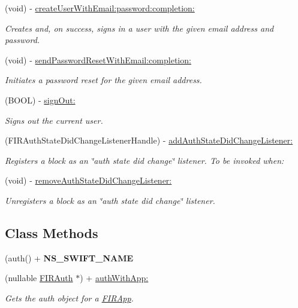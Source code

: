 \begin{DoxyCompactItemize}
(void) -\/ \hyperlink{interface_f_i_r_auth_aeaee7fcef878990954f8e72f7278cd7d}{create\+User\+With\+Email\+:password\+:completion\+:}
\begin{DoxyCompactList}\small\item\em Creates and, on success, signs in a user with the given email address and password. \end{DoxyCompactList}\item 
(void) -\/ \hyperlink{interface_f_i_r_auth_a05d5232f0666b7c197a9296fee7c3b68}{send\+Password\+Reset\+With\+Email\+:completion\+:}
\begin{DoxyCompactList}\small\item\em Initiates a password reset for the given email address. \end{DoxyCompactList}\item 
(B\+O\+O\+L) -\/ \hyperlink{interface_f_i_r_auth_ab0d5111f05c3f1906243852cc8ef41b1}{sign\+Out\+:}
\begin{DoxyCompactList}\small\item\em Signs out the current user. \end{DoxyCompactList}\item 
(F\+I\+R\+Auth\+State\+Did\+Change\+Listener\+Handle) -\/ \hyperlink{interface_f_i_r_auth_ad02b7299781bfc4b3509adc4f90359c3}{add\+Auth\+State\+Did\+Change\+Listener\+:}
\begin{DoxyCompactList}\small\item\em Registers a block as an \char`\"{}auth state did change\char`\"{} listener. To be invoked when\+: \end{DoxyCompactList}\item 
(void) -\/ \hyperlink{interface_f_i_r_auth_ab9f0ef0de75cb75153a933047bb5daec}{remove\+Auth\+State\+Did\+Change\+Listener\+:}
\begin{DoxyCompactList}\small\item\em Unregisters a block as an \char`\"{}auth state did change\char`\"{} listener. \end{DoxyCompactList}\end{DoxyCompactItemize}
\subsection*{Class Methods}
\begin{DoxyCompactItemize}
\item 
\hypertarget{interface_f_i_r_auth_a4278a762b4973096c3f6030b6f397615}{}(auth() + {\bfseries N\+S\+\_\+\+S\+W\+I\+F\+T\+\_\+\+N\+A\+M\+E}\label{interface_f_i_r_auth_a4278a762b4973096c3f6030b6f397615}

\item 
(nullable \hyperlink{interface_f_i_r_auth}{F\+I\+R\+Auth} $\ast$) + \hyperlink{interface_f_i_r_auth_ae1ef631c29aac73a5a2f1ab417ebda71}{auth\+With\+App\+:}
\begin{DoxyCompactList}\small\item\em Gets the auth object for a {\ttfamily \hyperlink{interface_f_i_r_app}{F\+I\+R\+App}}. \end{DoxyCompactList}\end{DoxyCompactItemize}
